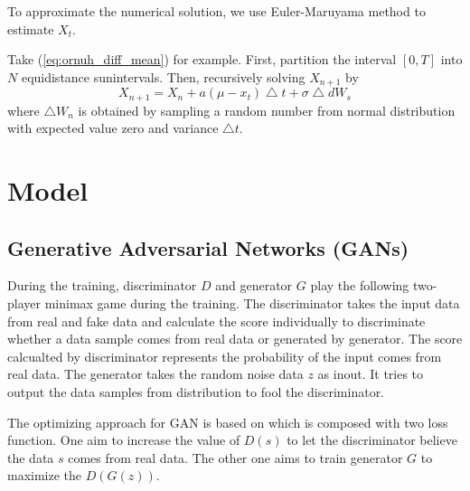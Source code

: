 \documentclass{article}
\begin{document}
	To approximate the numerical solution, we use Euler-Maruyama method to estimate $X_t$.
	
	Take (\ref{eq:ornuh_diff_mean}) for example. 
	First, partition the interval $[0,T]$ into $N$ equidistance sunintervals. 
	Then, recursively solving $X_{n+1}$ by
	\begin{equation}
		X_{n+1} = X_{n} + a (\mu-x_t) \bigtriangleup t+ \sigma \bigtriangleup dW_s
	\end{equation}
	where $\bigtriangleup W_n$ is obtained by sampling a random number from normal distribution with expected value zero and variance $\bigtriangleup t$.
	
	
	
	
	
	
	\section{Model}
	\subsection{Generative Adversarial Networks (GANs)}
	
	During the training, discriminator $D$ and generator $G$ play the following two-player minimax game during the training. 
	 The discriminator takes the input data from real and fake data and calculate the score individually to discriminate whether a data sample comes from real data or generated by generator. 
	 The score calcualted by discriminator represents the probability of the input comes from real data.  
	 The generator takes the random noise data $z$ as inout.
	 It tries to output the data samples from distribution to fool the discriminator.
	 
	 
	The optimizing approach for GAN is based on \cite{goodfellow} which is composed with two loss function.
	One aim to increase the value of $D(s)$ to let the discriminator believe the data $s$ comes from real data.
	The other one aims to train generator $G$ to maximize the $D(G(z))$. 
\end{document}
